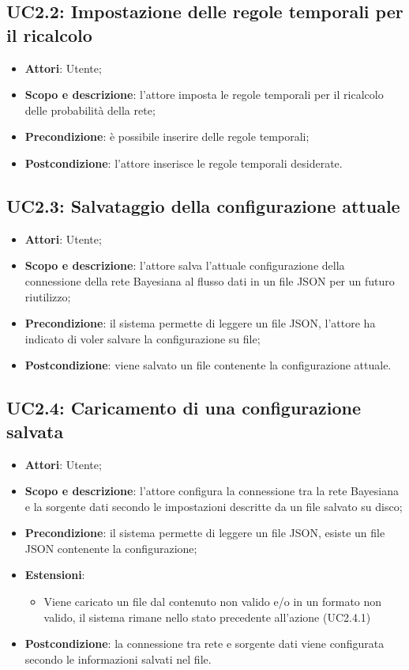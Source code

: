 \subsection{UC2.2: Impostazione delle regole temporali per il ricalcolo}
\hypertarget{UC2.2}{}
\begin{itemize}
	\item \textbf{Attori}: Utente;
	\item \textbf{Scopo e descrizione}: l'attore imposta le regole temporali per il ricalcolo delle probabilità della rete;
	\item \textbf{Precondizione}: è possibile inserire delle regole temporali;
	\item \textbf{Postcondizione}: l'attore inserisce le regole temporali desiderate.
\end{itemize}
\subsection{UC2.3: Salvataggio della configurazione attuale}

\hypertarget{UC2.3}{}
\begin{itemize}
	\item \textbf{Attori}: Utente;
	\item \textbf{Scopo e descrizione}: l'attore salva l'attuale configurazione della connessione della rete Bayesiana al flusso dati in un file JSON per un futuro riutilizzo;
	\item \textbf{Precondizione}: il sistema permette di leggere un file JSON, l'attore ha indicato di voler salvare la configurazione su file;
	\item \textbf{Postcondizione}: viene salvato un file contenente la configurazione attuale.
\end{itemize}

\subsection{UC2.4: Caricamento di una configurazione salvata}
\hypertarget{UC2.4}{}
\begin{itemize}
	\item \textbf{Attori}: Utente;
	\item \textbf{Scopo e descrizione}: l'attore configura la connessione tra la rete Bayesiana e la sorgente dati secondo le impostazioni descritte da un file salvato su disco;
	\item \textbf{Precondizione}: il sistema permette di leggere un file JSON, esiste un file JSON contenente la configurazione;
	\item \textbf{Estensioni}: 
	\begin{itemize}
		\item  Viene caricato un file dal contenuto non valido e/o in un formato non valido, il sistema rimane nello stato precedente all'azione (UC2.4.1)
	\end{itemize}
	\item \textbf{Postcondizione}: la connessione tra rete e sorgente dati viene configurata secondo le informazioni salvati nel file.
\end{itemize}

